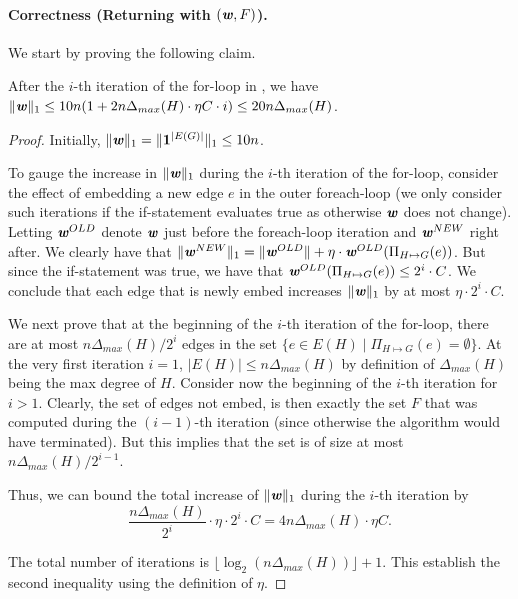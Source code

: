 \paragraph{Correctness (Returning with $(\boldsymbol{\mathit{w}}, F)$).} We start by proving the following claim.

\begin{invariant}\label{inv:totalWeight}
After the $i$-th iteration of the for-loop in , we have $\|\boldsymbol{\mathit{w}}\|_1 \leq 10n (1 + 2n \Delta_{max}(H) \cdot \eta C \cdot i) \leq 20n \Delta_{max}(H)$.
\end{invariant}
\begin{proof}
Initially, $\|\boldsymbol{\mathit{w}}\|_1 = \|\mathbf{1}^{|E(G)|}\|_1 \leq 10n$.

To gauge the increase in $\|\boldsymbol{\mathit{w}}\|_1$ during the $i$-th iteration of the for-loop, consider the effect of embedding a new edge $e$ in the outer foreach-loop (we only consider such iterations if the if-statement evaluates true as otherwise $\boldsymbol{\mathit{w}}$ does not change). 
Letting $\boldsymbol{\mathit{w}}^{OLD}$ denote $\boldsymbol{\mathit{w}}$ just before the foreach-loop iteration and $\boldsymbol{\mathit{w}}^{NEW}$ right after.
We clearly have that $\|\boldsymbol{\mathit{w}}^{NEW}\|_1 = \|\boldsymbol{\mathit{w}}^{OLD}\| + \eta \cdot \boldsymbol{\mathit{w}}^{OLD}(\Pi_{H \mapsto G}(e))$.
But since the if-statement was true, we have that $\boldsymbol{\mathit{w}}^{OLD}(\Pi_{H \mapsto G}(e)) \leq 2^i \cdot C$.
We conclude that each edge that is newly embed increases $\|\boldsymbol{\mathit{w}}\|_1$ by at most $\eta \cdot 2^i \cdot C$.

We next prove that at the beginning of the $i$-th iteration of the for-loop, there are at most $n \Delta_{max}(H)/2^{i}$ edges in the set $\{ e \in  E(H) \;|\; \Pi_{H \mapsto G}(e) = \emptyset\}$.
At the very first iteration $i = 1$, $|E(H)| \le n \Delta_{max}(H)$ by definition of $\Delta_{max}(H)$ being the max degree of $H$. Consider now the beginning of the $i$-th iteration for $i > 1$. Clearly, the set of edges not embed, is then exactly the set $F$ that was computed during the $(i-1)$-th iteration (since otherwise the algorithm would have terminated). But this implies that the set is of size at most $n \Delta_{max}(H) / 2^{i-1}$. 

Thus, we can bound the total increase of $\|\boldsymbol{\mathit{w}}\|_1$ during the $i$-th iteration by 
\[\frac{n \Delta_{max}(H)}{2^{i}} \cdot \eta \cdot 2^i \cdot C = 4n \Delta_{max}(H) \cdot \eta C.\]

The total number of iterations is $\lfloor \log_2(n\Delta_{max}(H)) \rfloor + 1.$ This establish the second inequality using the definition of $\eta$.
\end{proof}

